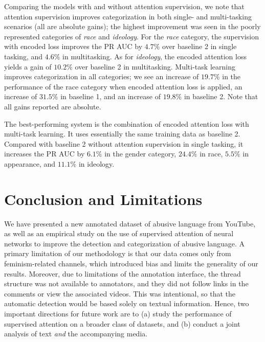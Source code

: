 \documentclass[letterpaper]{article} %
\begin{document}
Comparing the models with and without attention supervision, we note that attention supervision improves categorization in both single- and multi-tasking scenarios (all are absolute gains);  the highest improvement was seen in the poorly represented categories of \textit{race} and \textit{ideology}. For the \textit{race} category, the supervision with encoded loss improves the PR AUC  by $4.7\%$ over baseline 2 in single tasking, and $4.6\%$ in multitasking. As for \textit{ideology}, the encoded attention loss yields a gain of $10.2\%$ over baseline 2 in multitasking.  Multi-task learning improves categorization in all categories; we see an increase of $19.7\%$  in the performance of the race category when encoded attention loss is applied, an increase of $31.5\%$  in baseline 1, and an increase of $19.8\%$ in baseline 2. Note that all gains reported are absolute.

The best-performing system is the combination of encoded attention loss with multi-task learning. It uses essentially the same training data as baseline 2. Compared with baseline 2 without attention supervision in single tasking,  it increases the PR AUC by $6.1\%$ in the gender category, $24.4\%$ in race,  $5.5\%$ in appearance, and  $11.1\%$ in ideology.


\section{Conclusion and Limitations}
\label{sec:conclusion}
We have presented a new annotated dataset of abusive language from YouTube, as well as an  empirical study on the use of supervised attention of neural networks to improve the detection and categorization of abusive language.  A primary limitation of our methodology is that our data comes only from feminism-related channels, which introduced bias and limits the generality of our results.
Moreover, due to limitations of the annotation interface, the thread structure was not available to annotators, and they did not follow links in the comments or view the associated videos.
This was intentional, so that the automatic detection would be based solely on textual information.
Hence, two important directions for future work are to (a) study the performance of supervised attention on a broader class of datasets, and (b) conduct a joint analysis of  text \textit{and} the accompanying media.


\vspace{-3.06mm}
\end{document}
